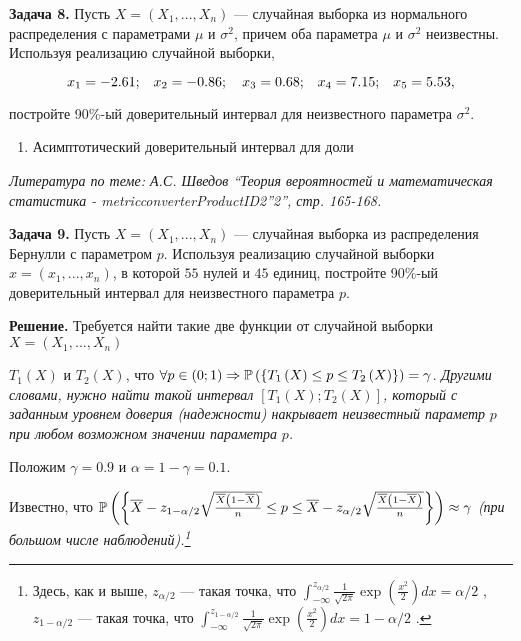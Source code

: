 \textbf{Задача 8.}  Пусть $X=\left(X_{1} ,...,X_{n} \right)$ --- случайная выборка из нормального распределения с параметрами $\mu $ и $\sigma ^{2} $, причем оба параметра $\mu $ и $\sigma ^{2} $ неизвестны. Используя реализацию случайной выборки, 

\[x_{1} =-{\rm 2.61;}\quad x_{2} =-{\rm 0.86};\quad x_{3} ={\rm 0.68;}\quad x_{4} ={\rm 7.15;}\quad x_{5} ={\rm 5.53,}\] 

постройте 90\%-ый доверительный интервал для неизвестного параметра $\sigma ^{2} $.



\begin{enumerate}
\item  Асимптотический доверительный интервал для доли 
\end{enumerate}



\textit{Литература по теме: А.С. Шведов ``Теория вероятностей и математическая статистика - metricconverterProductID2''2'', стр. 165-168.}



\textbf{Задача 9.}  Пусть $X=\left(X_{1} ,...,X_{n} \right)$ --- случайная выборка из распределения Бернулли с параметром $p$. Используя реализацию случайной выборки $x=\left(x_{1} ,...,x_{n} \right)$, в которой $55$ нулей и $45$ единиц, постройте 90\%-ый доверительный интервал для неизвестного параметра $p$.

\textbf{Решение.} Требуется найти такие две функции от случайной выборки $X=\left(X_{1} ,...,X_{n} \right)$ 

$T_{1} \left(X\right)$ и $T_{2} \left(X\right)$, что $\forall p\in \left(0;1\right)\Rightarrow {\rm {\mathbb P}}\left(\left\{T_{1} \left(X\right)\le p\le T_{2} \left(X\right)\right\}\right)=\gamma $. \textit{Другими словами, нужно найти такой интервал $\left[T_{1} \left(X\right);T_{2} \left(X\right)\right]$, который с заданным уровнем доверия (надежности) накрывает неизвестный параметр }$p$\textit{ при любом возможном значении параметра} $p$\textit{.}

Положим $\gamma =0.9$ и $\alpha =1-\gamma =0.1$.

Известно, что ${\rm {\mathbb P}}\left(\left\{\overline{X}-z_{1-\alpha /2} \sqrt{\frac{\overline{X}\left(1-\overline{X}\right)}{n} } \le p\le \overline{X}-z_{\alpha /2} \sqrt{\frac{\overline{X}\left(1-\overline{X}\right)}{n} } \right\}\right)\approx \gamma $ \textit{(при большом числе наблюдений).\footnote{ Здесь, как и выше,  $z_{\alpha /2} $  --- такая точка, что  $\int _{-\infty }^{z_{\alpha /2} }{\tfrac{1}{\sqrt{2\pi } }} \exp \left({\tfrac{x^{2} }{2}} \right)dx =\alpha /2$ ,  $z_{1-\alpha /2} $  --- такая точка, что  $\int _{-\infty }^{z_{1-\alpha /2} }{\tfrac{1}{\sqrt{2\pi } }} \exp \left({\tfrac{x^{2} }{2}} \right)dx =1-\alpha /2$ .}}


